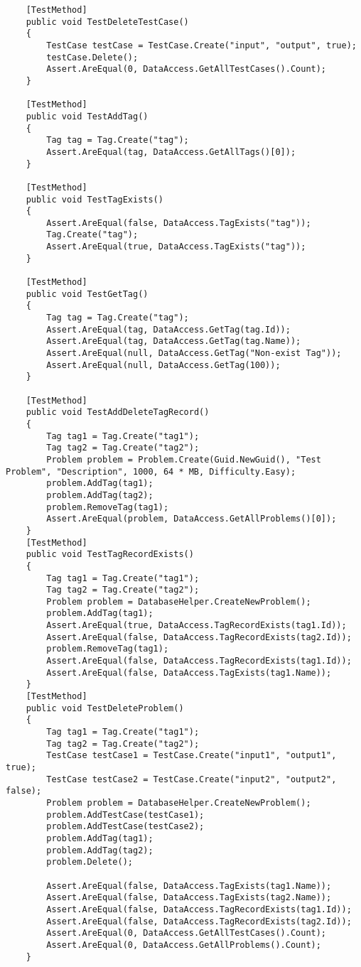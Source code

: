 \documentclass[report.tex]{subfiles}
\begin{document}
\begin{verbatim}
    [TestMethod]
    public void TestDeleteTestCase()
    {
        TestCase testCase = TestCase.Create("input", "output", true);
        testCase.Delete();
        Assert.AreEqual(0, DataAccess.GetAllTestCases().Count);
    }

    [TestMethod]
    public void TestAddTag()
    {
        Tag tag = Tag.Create("tag");
        Assert.AreEqual(tag, DataAccess.GetAllTags()[0]);
    }

    [TestMethod]
    public void TestTagExists()
    {
        Assert.AreEqual(false, DataAccess.TagExists("tag"));
        Tag.Create("tag");
        Assert.AreEqual(true, DataAccess.TagExists("tag"));
    }

    [TestMethod]
    public void TestGetTag()
    {
        Tag tag = Tag.Create("tag");
        Assert.AreEqual(tag, DataAccess.GetTag(tag.Id));
        Assert.AreEqual(tag, DataAccess.GetTag(tag.Name));
        Assert.AreEqual(null, DataAccess.GetTag("Non-exist Tag"));
        Assert.AreEqual(null, DataAccess.GetTag(100));
    }

    [TestMethod]
    public void TestAddDeleteTagRecord()
    {
        Tag tag1 = Tag.Create("tag1");
        Tag tag2 = Tag.Create("tag2");
        Problem problem = Problem.Create(Guid.NewGuid(), "Test Problem", "Description", 1000, 64 * MB, Difficulty.Easy);
        problem.AddTag(tag1);
        problem.AddTag(tag2);
        problem.RemoveTag(tag1);
        Assert.AreEqual(problem, DataAccess.GetAllProblems()[0]);
    }
    [TestMethod]
    public void TestTagRecordExists()
    {
        Tag tag1 = Tag.Create("tag1");
        Tag tag2 = Tag.Create("tag2");
        Problem problem = DatabaseHelper.CreateNewProblem();
        problem.AddTag(tag1);
        Assert.AreEqual(true, DataAccess.TagRecordExists(tag1.Id));
        Assert.AreEqual(false, DataAccess.TagRecordExists(tag2.Id));
        problem.RemoveTag(tag1);
        Assert.AreEqual(false, DataAccess.TagRecordExists(tag1.Id));
        Assert.AreEqual(false, DataAccess.TagExists(tag1.Name));
    }
    [TestMethod]
    public void TestDeleteProblem()
    {
        Tag tag1 = Tag.Create("tag1");
        Tag tag2 = Tag.Create("tag2");
        TestCase testCase1 = TestCase.Create("input1", "output1", true);
        TestCase testCase2 = TestCase.Create("input2", "output2", false);
        Problem problem = DatabaseHelper.CreateNewProblem();
        problem.AddTestCase(testCase1);
        problem.AddTestCase(testCase2);
        problem.AddTag(tag1);
        problem.AddTag(tag2);
        problem.Delete();

        Assert.AreEqual(false, DataAccess.TagExists(tag1.Name));
        Assert.AreEqual(false, DataAccess.TagExists(tag2.Name));
        Assert.AreEqual(false, DataAccess.TagRecordExists(tag1.Id));
        Assert.AreEqual(false, DataAccess.TagRecordExists(tag2.Id));
        Assert.AreEqual(0, DataAccess.GetAllTestCases().Count);
        Assert.AreEqual(0, DataAccess.GetAllProblems().Count);
    }
\end{verbatim}
\end{document}
